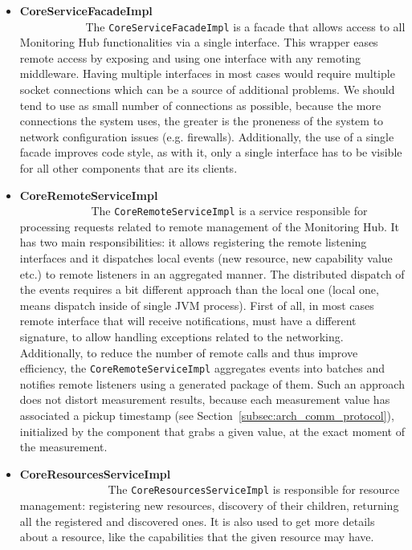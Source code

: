\begin{itemize}

\item {\bf CoreServiceFacadeImpl}~~~~~~~~~~~~~~~~~~~~~~~~~~~~~~~~~~~~~~~~~~~~~~~~~~~~~~~~\linebreak
The \texttt{CoreServiceFacadeImpl} is a facade that allows access to all Monitoring Hub functionalities via a single interface. This wrapper eases remote access by exposing and using one interface with any remoting middleware. Having multiple interfaces in most cases would require multiple socket connections which can be a source of additional problems. We should tend to use as small number of connections as possible, because the more connections the system uses, the greater is the proneness of the system to network configuration issues (e.g. firewalls). Additionally, the use of a single facade improves code style, as with it, only a single interface has to be visible for all other components that are its clients.

\item {\bf CoreRemoteServiceImpl}~~~~~~~~~~~~~~~~~~~~~~~~~~~~~~~~~~~~~~~~~~~~~~~~~~~~~~~~\linebreak
The \texttt{CoreRemoteServiceImpl} is a service responsible for processing requests related to remote management of the Monitoring Hub. It has two main responsibilities: it allows registering the remote listening interfaces and it dispatches local events (new resource, new capability value etc.) to remote listeners in an aggregated manner. The distributed dispatch of the events requires a bit different approach than the local one (local one, means dispatch inside of single JVM process). First of all, in most cases remote interface that will receive notifications, must have a different signature, to allow handling exceptions related to the networking. Additionally, to reduce the number of remote calls and thus improve efficiency, the \texttt{CoreRemoteServiceImpl} aggregates events into batches and notifies remote listeners using a generated package of them. Such an approach does not distort measurement results, because each measurement value has associated a pickup timestamp (see Section~\ref{subsec:arch_comm_protocol}), initialized by the component that grabs a given value, at the exact moment of the measurement.

\item {\bf CoreResourcesServiceImpl}~~~~~~~~~~~~~~~~~~~~~~~~~~~~~~~~~~~~~~~~~~~~~~~~~~~~~~~~\linebreak
The \texttt{CoreResourcesServiceImpl} is responsible for resource management: registering new resources, discovery of their children, returning all the registered and discovered ones. It is also used to get more details about a resource, like the capabilities that the given resource may have.


\end{itemize}
